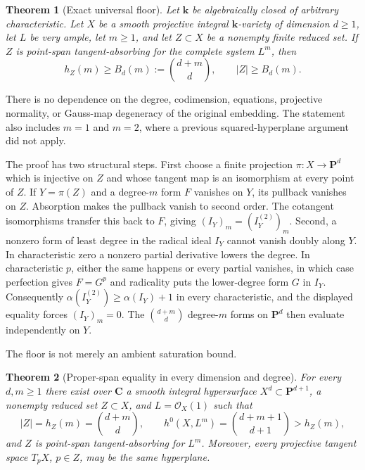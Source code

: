 \documentclass[11pt]{article}
\newtheorem{theorem}{Theorem}[section]
\newcommand{\PP}{\mathbf P}
\newcommand{\CC}{\mathbf C}
\newcommand{\kk}{\mathbf k}
\newcommand{\cO}{\mathcal O}
\newcommand{\BZ}{B_d(m)}
\begin{document}
\begin{theorem}[Exact universal floor]\label{thm:exact-floor}
Let $\kk$ be algebraically closed of arbitrary characteristic.  Let $X$ be a
smooth projective integral $\kk$-variety of dimension $d\geq1$, let $L$ be
very ample, let $m\geq1$, and let $Z\subset X$ be a nonempty finite reduced
set.  If $Z$ is point-span tangent-absorbing for the complete system $L^m$,
then
\begin{equation}\label{eq:exact-floor}
 h_Z(m)\geq \BZ:=\binom{d+m}{d},
 \qquad |Z|\geq \BZ.
\end{equation}
\end{theorem}

There is no dependence on the degree, codimension, equations, projective
normality, or Gauss-map degeneracy of the original embedding.  The statement
also includes $m=1$ and $m=2$, where a previous squared-hyperplane argument
did not apply.

The proof has two structural steps.  First choose a finite projection
$\pi:X\to\PP^d$ which is injective on $Z$ and whose tangent map is an
isomorphism at every point of $Z$.
If $Y=\pi(Z)$ and a degree-$m$ form $F$ vanishes on $Y$, its pullback vanishes
on $Z$.  Absorption makes the pullback vanish to second order.  The cotangent
isomorphisms transfer this back to $F$, giving
$(I_Y)_m=(I_Y^{(2)})_m$.  Second, a nonzero form of least degree in the radical
ideal $I_Y$ cannot vanish doubly along $Y$.  In characteristic zero a nonzero
partial derivative lowers the degree.  In characteristic $p$, either the same
happens or every partial vanishes, in which case perfection gives $F=G^p$ and
radicality puts the lower-degree form $G$ in $I_Y$.  Consequently
$\alpha(I_Y^{(2)})\geq\alpha(I_Y)+1$ in every characteristic, and the displayed
equality forces $(I_Y)_m=0$.  The $\binom{d+m}{d}$ degree-$m$ forms on $\PP^d$
then evaluate independently on $Y$.

The floor is not merely an ambient saturation bound.

\begin{theorem}[Proper-span equality in every dimension and degree]
\label{thm:sharpness}
For every $d,m\geq1$ there exist over $\CC$ a smooth integral hypersurface
$X^d\subset\PP^{d+1}$, a nonempty reduced set $Z\subset X$, and
$L=\cO_X(1)$ such that
\[
 |Z|=h_Z(m)=\binom{d+m}{d},\qquad
 h^0(X,L^m)=\binom{d+m+1}{d+1}>h_Z(m),
\]
and $Z$ is point-span tangent-absorbing for $L^m$.  Moreover, every
projective tangent space $T_pX$, $p\in Z$, may be the same hyperplane.
\end{theorem}
\end{document}
